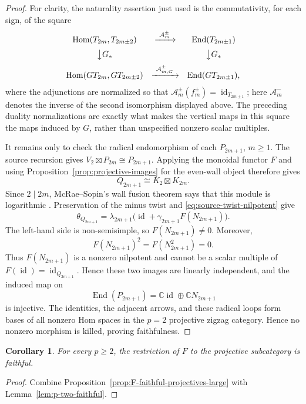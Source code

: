 \documentclass[12pt,leqno]{amsart}
\numberwithin{equation}{section}
\newtheorem{cor}[thm]{Corollary}
\newcommand{\End}{\operatorname{End}}
\newcommand{\Hom}{\operatorname{Hom}}
\newcommand{\id}{\operatorname{id}}
\newcommand{\boxt}{\boxtimes}
\def\C{\mathbb{C}}
\begin{document}
\begin{proof}
For clarity, the naturality assertion just used is the commutativity, for
each sign, of the square
\[
 \begin{array}{ccc}
  \Hom(T_{2m},T_{2m\pm2})&\xrightarrow{\ \mathcal A_m^\pm\ }&
       \End(T_{2m\pm1})\\[2mm]
  \big\downarrow G_*&&\big\downarrow G_*\\[2mm]
  \Hom(GT_{2m},GT_{2m\pm2})&\xrightarrow{\ \mathcal A_{m,G}^\pm\ }&
       \End(GT_{2m\pm1}),
 \end{array}
\]
where the adjunctions are normalized so that
$\mathcal A_m^\pm(f_m^\pm)=\id_{T_{2m\pm1}}$; here
$\mathcal A_m^-$ denotes the inverse of the second isomorphism displayed
above.  The preceding duality
normalizations are exactly what makes the vertical maps in this square the
maps induced by $G$, rather than unspecified nonzero scalar multiples.

It remains only to check the radical endomorphism of each $P_{2m+1}$,
$m\geq1$.  The source recursion gives
$V_2\boxt P_{2m}\cong P_{2m+1}$.  Applying the monoidal functor $F$ and
using Proposition~\ref{prop:projective-images} for the even-wall object
therefore gives
\[
 Q_{2m+1}\cong K_2\boxt K_{2m}.
\]
Since $2\mid 2m$, McRae--Sopin's wall fusion theorem says that this module
is logarithmic
\cite[Theorem~6.5 and Remark~6.11]{McRaeSopin}.  Preservation of the minus
twist and \eqref{eq:source-twist-nilpotent} give
\[
 \theta_{Q_{2m+1}}
 =\lambda_{2m+1}
  \bigl(\id+\gamma_{2m+1}F(N_{2m+1})\bigr).
\]
The left-hand side is non-semisimple, so $F(N_{2m+1})\neq0$.  Moreover,
\[
 F(N_{2m+1})^2=F(N_{2m+1}^2)=0.
\]
Thus $F(N_{2m+1})$ is a nonzero nilpotent and cannot be a scalar multiple
of $F(\id)=\id_{Q_{2m+1}}$.  Hence these two images are linearly independent,
and the induced map on
\[
 \End(P_{2m+1})=\C\id\oplus\C N_{2m+1}
\]
is injective.  The identities, the adjacent arrows, and these radical loops
form bases of all nonzero Hom spaces in the $p=2$ projective zigzag
category.  Hence no nonzero morphism is killed, proving faithfulness.
\end{proof}

\begin{cor}\label{cor:F-faithful-projectives}
For every $p\geq2$, the restriction of $F$ to the projective subcategory is
faithful.
\end{cor}

\begin{proof}
Combine Proposition~\ref{prop:F-faithful-projectives-large} with
Lemma~\ref{lem:p-two-faithful}.
\end{proof}
\end{document}
